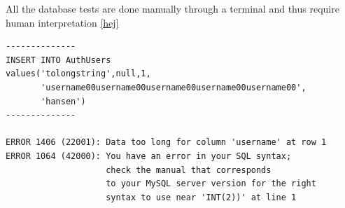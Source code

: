 All the database tests are done manually through a terminal and thus require human interpretation \autoref{hej}


\begin{Code}
\begin{lstlisting}[label=hej,caption=ninja]
--------------
INSERT INTO AuthUsers
values('tolongstring',null,1,
       'username00username00username00username00username00',
       'hansen')
--------------

ERROR 1406 (22001): Data too long for column 'username' at row 1
ERROR 1064 (42000): You have an error in your SQL syntax;
                    check the manual that corresponds
                    to your MySQL server version for the right 
                    syntax to use near 'INT(2))' at line 1
\end{lstlisting}
\end{Code}







